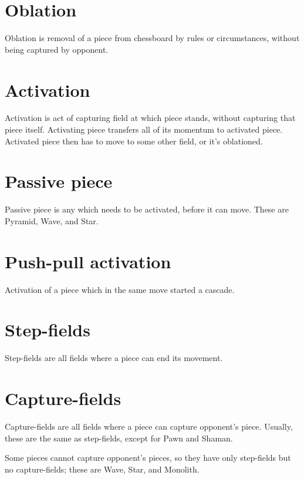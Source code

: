 \section*{Oblation}
\label{sec:Terms/Oblation}
Oblation is removal of a piece from chessboard by rules or circumstances,
without being captured by opponent.

\section*{Activation}
\label{sec:Terms/Activation}
Activation is act of capturing field at which piece stands, without capturing that
piece itself. Activating piece transfers all of its momentum to activated piece.
Activated piece then has to move to some other field, or it's oblationed.

\section*{Passive piece}
\label{sec:Terms/Passive piece}
Passive piece is any which needs to be activated, before it can move.
These are Pyramid, Wave, and Star.

\section*{Push-pull activation}
\label{sec:Terms/Push-pull activation}
Activation of a piece which in the same move started a cascade.

\section*{Step-fields}
\label{sec:Terms/Step-fields}
Step-fields are all fields where a piece can end its movement.

\section*{Capture-fields}
\label{sec:Terms/Capture-fields}
Capture-fields are all fields where a piece can capture opponent's piece.
Usually, these are the same as step-fields, except for Pawn and Shaman.

Some pieces cannot capture opponent's pieces, so they have only step-fields
but no capture-fields; these are Wave, Star, and Monolith.


